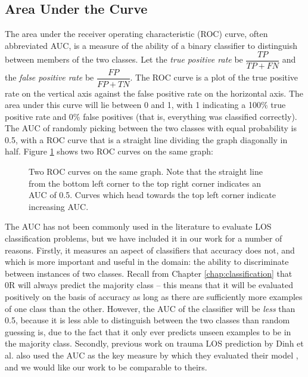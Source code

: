 \subsection{Area Under the Curve}
The area under the receiver operating characteristic (ROC) curve, often
abbreviated AUC, is a measure of the ability of a binary classifier to
distinguish between members of the two classes. Let the \textit{true
positive rate} be $\dfrac{TP}{TP + FN}$ and the \textit{false positive rate}
be $\dfrac{FP}{FP + TN}$. The ROC curve is a plot of the true positive rate
on the vertical axis against the false positive rate on the horizontal axis.
The area under this curve will lie between 0 and 1, with 1 indicating a
100\% true positive rate and 0\% false positives (that is, everything was
classified correctly). The AUC of randomly picking between the two classes
with equal probability is 0.5, with a ROC curve that is a straight line
dividing the graph diagonally in half. Figure \ref{fig:sampleroc} shows
two ROC curves on the same graph:

\begin{figure}[h]
\caption{Two ROC curves on the same graph. Note that the straight line from
the bottom left corner to the top right corner indicates an AUC of 0.5. Curves
which head towards the top left corner indicate increasing AUC.}
\label{fig:sampleroc}
\centering
\end{figure}

The AUC has not been commonly used in the literature to evaluate LOS
classification problems, but we have included it in our work for a number of
reasons. Firstly, it measures an aspect of classifiers that accuracy does not,
and which is more important and useful in the domain: the ability to
discriminate between instances of two classes. Recall from Chapter
\ref{chap:classification} that 0R will always predict the majority class --
this means that it will be evaluated positively on the basis of accuracy
as long as there are sufficiently more examples of one class than the other.
However, the AUC of the classifier will be \textit{less} than 0.5, because it
is less able to distinguish between the two classes than random guessing is,
due to the fact that it only ever predicts unseen examples to be in the
majority class. Secondly, previous work on trauma LOS prediction by Dinh et al.
also used the AUC as the key measure by which they evaluated their model
\cite{Dinh2013a}, and we would like our work to be comparable to theirs.


